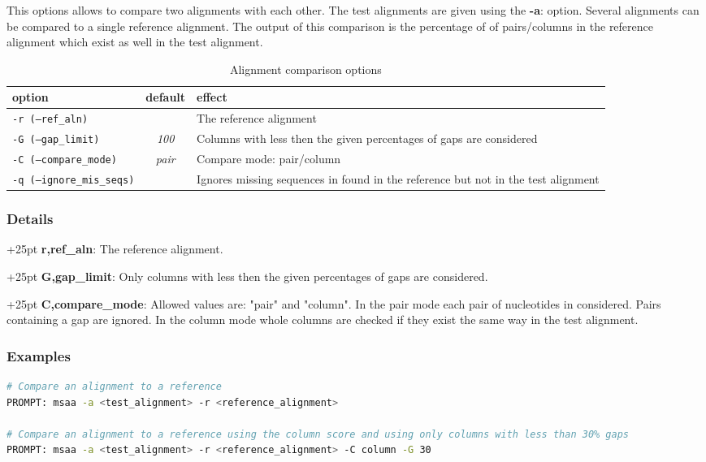 \documentclass[a4paper,10pt,parskip=half]{scrartcl}
\begin{document}
This options allows to compare two alignments with each other. The test alignments are given using the \textbf{-a}: option. Several alignments can be compared to a single reference alignment. The output of this comparison is the percentage of of pairs/columns in the reference alignment which exist as well in the test alignment.
\begin{table}[h]
\caption{Alignment comparison options}
\begin{tabular}{lcp{7cm}}\hline
option& default & effect \\\hline
\texttt{-r (--ref\_aln)}&& The reference alignment\\
\texttt{-G (--gap\_limit)}&\textit{100}&     Columns with less then the given percentages of gaps are considered\\
\texttt{-C (--compare\_mode)}&\textit{pair}& Compare mode: pair/column\\
\texttt{-q (--ignore\_mis\_seqs)} && Ignores missing sequences in found in the reference but not in the test alignment\\
\end{tabular}
\end{table}
\subsubsection*{Details}

\hangindent+25pt 
\textbf{r,ref\_aln}: The reference alignment.   
                             
\hangindent+25pt 
\textbf{G,gap\_limit}: Only columns with less then the given percentages of gaps are considered. 

\hangindent+25pt                              
\textbf{C,compare\_mode}: Allowed values are: "pair" and "column". In the pair mode each pair of nucleotides in considered. Pairs containing a gap are ignored. In the column mode whole columns are checked if they exist the same way in the test alignment.

\subsubsection*{Examples}
\begin{lstlisting}[language=bash,frame=none,morekeywords={PROMPT}]
# Compare an alignment to a reference
PROMPT: msaa -a <test_alignment> -r <reference_alignment>

# Compare an alignment to a reference using the column score and using only columns with less than 30% gaps
PROMPT: msaa -a <test_alignment> -r <reference_alignment> -C column -G 30
\end{lstlisting}
\end{document}
